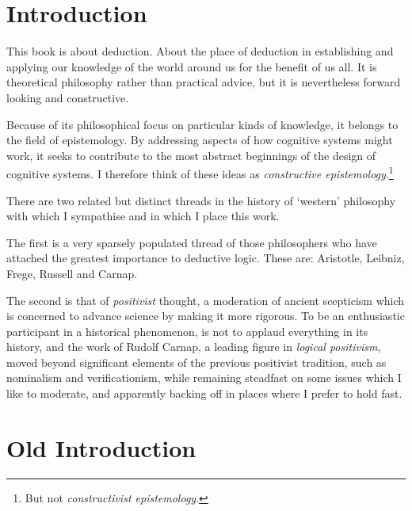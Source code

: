 

\chapter{Introduction}\label{Introduction}

This book is about deduction.
About the place of deduction in establishing and applying our knowledge of the world around us for the benefit of us all.
It is theoretical philosophy rather than practical advice, but it is nevertheless forward looking and constructive.

Because of its philosophical focus on particular kinds of knowledge, it belongs to the field of epistemology.
By addressing aspects of how cognitive systems might work, it seeks to contribute to the most abstract beginnings of the design of cognitive systems.
I therefore think of these ideas as \emph{constructive epistemology}.\footnote{But not \emph{constructivist epistemology}.}

There are two related but distinct threads in the history of `western' philosophy with which I sympathise and in which I place this work.

The first is a very sparsely populated thread of those philosophers who have attached the greatest importance to deductive logic.
These are: Aristotle, Leibniz, Frege, Russell and Carnap.

The second is that of \emph{positivist} thought, a moderation of ancient scepticism which is concerned to advance science by making it more rigorous.
To be an enthusiastic participant in a historical phenomenon, is not to applaud everything in its history, and the work of Rudolf Carnap, a leading figure in \emph{logical positivism}, moved beyond significant elements of the previous positivist tradition, such as nominalism and verificationism, while remaining steadfast on some issues which I like to moderate, and apparently backing off in places where I prefer to hold fast.

\chapter{Old Introduction}\label{OldIntroduction}

